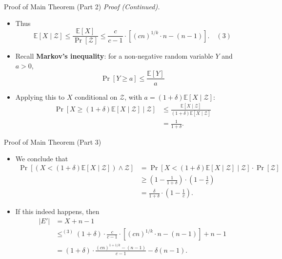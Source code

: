 \documentclass{beamer}
\begin{document}
\begin{frame}{Proof of Main Theorem (Part 2)}
    \small
    \textit{Proof (Continued).}
    \begin{itemize}
        \item Thus
        \[ \mathbb{E}[X \mid \mathcal{Z}] \le \frac{\mathbb{E}[X]}{\Pr[\mathcal{Z}]} \le \frac{c}{c-1} \cdot \left[ (cn)^{1/k} \cdot n - (n - 1) \right] . \quad (3) \]
        
        \item Recall \textbf{Markov's inequality}: for a non-negative random variable $Y$ and $a > 0$,
        \[ \Pr[Y \ge a] \le \frac{\mathbb{E}[Y]}{a} \]
        
        \item Applying this to $X$ conditional on $\mathcal{Z}$, with $a = (1+\delta)\mathbb{E}[X \mid \mathcal{Z}]$:
        \begin{align*}
            \Pr[X \ge (1+\delta)\mathbb{E}[X \mid \mathcal{Z}] \mid \mathcal{Z}] &\le \frac{\mathbb{E}[X \mid \mathcal{Z}]}{(1+\delta)\mathbb{E}[X \mid \mathcal{Z}]} \\
            &= \frac{1}{1+\delta} .
        \end{align*}
    \end{itemize}
\end{frame}

\begin{frame}{Proof of Main Theorem (Part 3)}
    \small
    \begin{itemize}
        \item We conclude that
        \begin{align*}
            \Pr[(X < (1+\delta)\mathbb{E}[X \mid \mathcal{Z}]) \wedge \mathcal{Z}] &= \Pr[X < (1+\delta)\mathbb{E}[X \mid \mathcal{Z}] \mid \mathcal{Z}] \cdot \Pr[\mathcal{Z}] \\
            &\ge \left(1 - \frac{1}{1+\delta}\right) \cdot \left(1 - \frac{1}{c}\right) \\
            &= \frac{\delta}{1+\delta} \cdot \left(1 - \frac{1}{c}\right) .
        \end{align*}
        
        \item If this indeed happens, then
        \begin{align*}
            |E'| &= X + n - 1 \\
            &\le^{(3)} (1 + \delta) \cdot \frac{c}{c-1} \cdot \left[ (cn)^{1/k} \cdot n - (n - 1) \right] + n - 1 \\
            &= (1+\delta) \cdot \frac{(cn)^{1+1/k} - (n-1)}{c-1} - \delta(n-1) . \tag*{$\square$}
        \end{align*}
    \end{itemize}
\end{frame}
\end{document}
